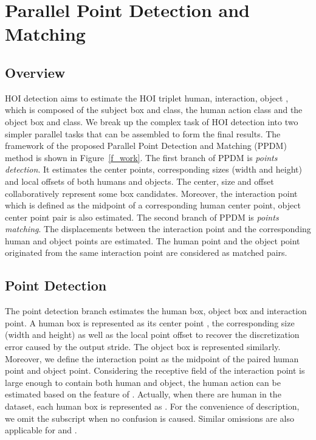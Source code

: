 \documentclass[10pt,twocolumn,letterpaper]{article}
\begin{document}
\section{Parallel Point Detection and Matching}
\subsection{Overview}

HOI detection aims to estimate the HOI triplet  human, interaction, object , which is composed of the subject box and class, the human action class and the object box and class. 
 We break up the complex task of  HOI detection into two simpler parallel tasks that can be assembled to form the final results.
 The framework of the proposed Parallel Point Detection and Matching (PPDM) method is shown in Figure~\ref{f_work}.
The first branch of PPDM is \emph{points detection}. It estimates the center points, corresponding sizes (width and height) and local offsets of both humans and objects.
The center, size and offset collaboratively represent some box candidates.
Moreover, the interaction point which is defined as the midpoint of a corresponding   human center point, object center point   pair is also estimated.  The second branch of  PPDM is  \emph{points matching}.
The displacements between the interaction point and the corresponding human and object points are estimated. The human point and the object point originated from the same interaction point are considered as matched pairs. 


  
 




\subsection{Point Detection}

The point detection branch estimates the human box, object box and interaction point. A human box  is represented as its center point , the corresponding size (width and height)    as well as  the local point offset     to recover the discretization error caused by the output stride. The object box is represented similarly.  Moreover, we define the interaction point  as the midpoint of the paired human point and object  point. Considering the receptive field of the interaction point is large enough to contain both human and object, the human action  can be estimated based on the feature  of . Actually, when there are  human in the dataset, each human box is represented as . For the convenience of description, we omit the subscript  when no confusion is caused. Similar omissions are also  applicable for  and . 
\end{document}
